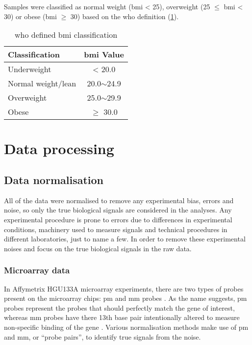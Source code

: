 Samples were classified as normal weight (\gls{bmi} \textless{} 25), overweight (25 $\leq$ \gls{bmi} \textless{} 30) or obese (\gls{bmi} $\geq$ 30) based on the \gls{who} definition (\cref{tab:whobmiclass}).

\begin{table}[htb]
	\caption{\gls{who} defined \gls{bmi} classification}
	\label{tab:whobmiclass}
	\begin{center}
		\begin{tabular}{lc}
			Classification & \gls{bmi} Value\\
			\hline
			\rule{0pt}{2.25ex}Underweight & \textless{} 20.0\\
			Normal weight/lean & 20.0$\sim$24.9\\
			Overweight & 25.0$\sim$29.9\\
			Obese & $\geq{}$ 30.0\\
			\hline
			\hline
		\end{tabular}
	\end{center}
\end{table}

\section{Data processing}
\label{sec:datproc}

\subsection{Data normalisation}
\label{sub:data_normalisation}

All of the data were normalised to remove any experimental bias, errors and noise, so only the true biological signals are considered in the analyses.
Any experimental procedure is prone to errors due to differences in experimental conditions, machinery used to measure signals and technical procedures in different laboratories, just to name a few.
In order to remove these experimental noises and focus on the true biological signals in the raw data.

\subsubsection{Microarray data}
\label{ssub:microarray_data}

In Affymetrix HGU133A microarray experiments, there are two types of probes present on the microarray chips: \gls{pm} and \gls{mm} probes \citep{Irizarry2003}.
As the name suggests, \gls{pm} probes represent the probes that should perfectly match the gene of interest, whereas \gls{mm} probes have there 13th base pair intentionally altered to measure non-specific binding of the gene \citep{Irizarry2003}.
Various normalisation methods make use of \gls{pm} and \gls{mm}, or ``probe pairs'', to identify true signals from the noise.

